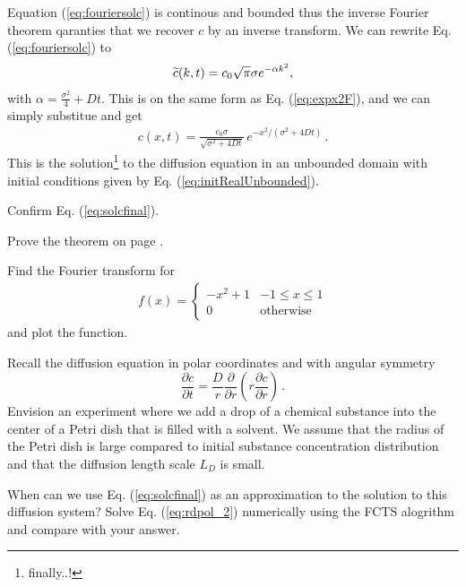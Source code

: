 Equation (\ref{eq:fouriersolc}) is continous and bounded thus the inverse Fourier theorem qaranties that we recover $c$ by 
an inverse transform. We can rewrite Eq. (\ref{eq:fouriersolc}) to 
\begin{eqnarray}
	\widetilde{c}(k, t) = c_0 \sqrt{\pi} \sigma e^{-\alpha k^2} ,
\end{eqnarray}
with $\alpha = \frac{\sigma^2}{4} + Dt$. This is on the same form as Eq. (\ref{eq:expx2F}), and we can simply substitue and get
\begin{eqnarray}
	\label{eq:solcfinal}
	c(x,t)=\frac{c_0 \sigma}{\sqrt{\sigma^2 + 4 D t}} \, e^{-x^2/(\sigma^2 + 4Dt)} \, .
\end{eqnarray}
This is the solution\footnote{finally..!} to the diffusion equation in an unbounded domain with initial conditions given by 
Eq. (\ref{eq:initRealUnbounded}).

\begin{exerciseregion}

	\begin{exercise}
		Confirm Eq. (\ref{eq:solcfinal}).
	\end{exercise}
	
	\begin{exercise}
		Prove the theorem on page \pageref{missingproof}. 
	\end{exercise}

	\begin{exercise}
		Find the Fourier transform for 
		\begin{eqnarray}
			f(x) =
			\left\{
		    \begin{array}{ll}
		        -x^2+1 & -1 \leq x \leq 1 \\
					0 &  \text{otherwise}
			\end{array}
			\right.
		\end{eqnarray}
		and plot the function.
	\end{exercise}

	\begin{exploration}
		Recall the diffusion equation in polar coordinates and with angular symmetry 
		\begin{equation}
			\label{eq:rdpol_2}
				\frac{\partial c}{\partial t} = 
			\frac{D}{r}\frac{\partial}{\partial r}
			\left(  r\frac{\partial c}{\partial r} \right) \, .
		\end{equation}
		Envision an experiment where we add a drop of a chemical substance into the 
		center of a Petri dish that is filled with a solvent. 
		We assume that the radius of the Petri dish is large 
		compared to initial substance concentration distribution and that the diffusion length scale $L_D$ 
		is small. 

		When can we use Eq. (\ref{eq:solcfinal}) as an approximation to the solution 
		to this diffusion system? Solve Eq. (\ref{eq:rdpol_2}) numerically using the 
		FCTS alogrithm and compare with your answer.
	\end{exploration}
\end{exerciseregion}

